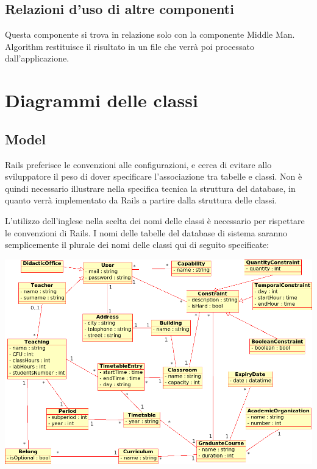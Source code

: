 \documentclass[11pt,a4paper]{article}
\begin{document}
\subsection{Relazioni d'uso di altre componenti}
Questa componente si trova in relazione solo con la componente Middle Man. Algorithm restituisce il risultato in un file che verrà poi processato dall'applicazione.

\section{Diagrammi delle classi}
\subsection{Model}
Rails preferisce le convenzioni alle configurazioni, e cerca di evitare allo sviluppatore il peso di dover specificare l'associazione tra tabelle e classi.
Non è quindi necessario illustrare nella specifica tecnica la struttura del database, in quanto verrà implementato da Rails a partire dalla struttura delle classi.

L'utilizzo dell'inglese nella scelta dei nomi delle classi è necessario per rispettare le convenzioni di Rails.
I nomi delle tabelle del database di sistema saranno semplicemente il plurale dei nomi delle classi qui di seguito specificate:
\\
\begin{center}
\includegraphics[scale=0.33]{images/class_diagram.png}
\end{center}
\end{document}
